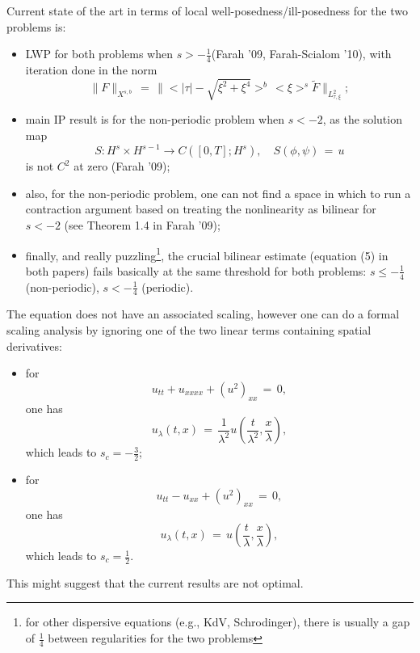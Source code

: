 \documentclass[12pt,reqno]{amsart}
\numberwithin{equation}{section}  %
\numberwithin{figure}{section}
\begin{document}
Current state of the art in terms of local well-posedness/ill-posedness for the two problems is:
\begin{itemize}
\item LWP for both problems when $s>-\frac 14$(Farah '09, Farah-Scialom '10), with iteration done in
the norm
\[
\|F\|_{X^{s,b}}\,=\,\|<|\tau|-\sqrt{\xi^2+\xi^4}>^b\,<\xi>^s \tilde{F}\|_{L^2_{\tau,\xi}};
\]

\item main IP result is for the non-periodic problem when $s<-2$, as the solution map 
\[
S: H^s\times H^{s-1} \to C([0,T]; H^s), \quad
S(\phi,\psi)\,=\,u
\]
is not $C^2$ at zero (Farah '09);

\item also, for the non-periodic problem, one can not find a space in which to run a contraction argument based on treating the nonlinearity as bilinear for $s<-2$ (see Theorem 1.4 in Farah '09);

\item finally, and really puzzling\footnote{for other dispersive equations (e.g., KdV, Schrodinger), there is usually a gap of $\frac 14$ between regularities for the two problems}, the crucial bilinear estimate (equation (5) in both papers) fails basically at the same threshold for both problems: $s\leq -\frac 14$ (non-periodic), $s<-\frac{1}{4}$ (periodic).
\end{itemize}

The equation does not have an associated scaling, however one can do a formal scaling analysis by ignoring one of the two linear terms containing spatial derivatives:
\begin{itemize}
\item for 
\[
u_{tt}+u_{xxxx}+(u^2)_{xx}\,=\,0,
\]
one has 
\[
u_{\lambda}(t,x)\,=\,\frac{1}{\lambda^2}u\left(\frac{t}{\lambda^2}, \frac{x}{\lambda}\right),
\]
which leads to $s_c=-\frac 32$;

\item for 
\[
u_{tt}-u_{xx}+(u^2)_{xx}\,=\,0,
\]
one has 
\[
u_{\lambda}(t,x)\,=\,u\left(\frac{t}{\lambda}, \frac{x}{\lambda}\right),
\]
which leads to $s_c=\frac 12$.
\end{itemize}

This might suggest that the current results are not optimal.


 
 
\end{document}
